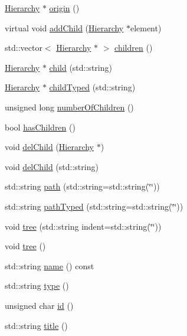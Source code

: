 \begin{DoxyCompactItemize}
\hyperlink{classHierarchy}{Hierarchy} $\ast$ \hyperlink{classHierarchy_aee461dc930ce3871636ff87f075b1b83}{origin} ()
\item 
virtual void \hyperlink{classHierarchy_ad677774ff38fcb257c04a3a10d471fac}{add\+Child} (\hyperlink{classHierarchy}{Hierarchy} $\ast$element)
\item 
std\+::vector$<$ \hyperlink{classHierarchy}{Hierarchy} $\ast$ $>$ \hyperlink{classHierarchy_aa9a76f69e98e052ee1a6e32cea006288}{children} ()
\item 
\hyperlink{classHierarchy}{Hierarchy} $\ast$ \hyperlink{classHierarchy_a1e207f973c694b538bf90107b4868817}{child} (std\+::string)
\item 
\hyperlink{classHierarchy}{Hierarchy} $\ast$ \hyperlink{classHierarchy_a0c15a5276a3b80b4354d6bd8a01e0708}{child\+Typed} (std\+::string)
\item 
unsigned long \hyperlink{classHierarchy_ab16e84de65fd84e14001a6cf941c8be4}{number\+Of\+Children} ()
\item 
bool \hyperlink{classHierarchy_a255174fe4d316d2a3f430dcb9dab29f1}{has\+Children} ()
\item 
void \hyperlink{classHierarchy_a2b2b359fac003233f65786a616766bde}{del\+Child} (\hyperlink{classHierarchy}{Hierarchy} $\ast$)
\item 
void \hyperlink{classHierarchy_a1928ac7615fe0b5e55cd707f70dc6781}{del\+Child} (std\+::string)
\item 
std\+::string \hyperlink{classHierarchy_aa7990fa7caf132d83e361ce033c6c65a}{path} (std\+::string=std\+::string(\char`\"{}\char`\"{}))
\item 
std\+::string \hyperlink{classHierarchy_a1efd56cd164d328d2002e53a10a19b8c}{path\+Typed} (std\+::string=std\+::string(\char`\"{}\char`\"{}))
\item 
void \hyperlink{classHierarchy_a76e914b9a677a22a82deb74d892bf261}{tree} (std\+::string indent=std\+::string(\char`\"{}\char`\"{}))
\item 
void \hyperlink{classHierarchy_a594c294c5f60c230e106d522ed008212}{tree} ()
\item 
std\+::string \hyperlink{classObject_a300f4c05dd468c7bb8b3c968868443c1}{name} () const
\item 
std\+::string \hyperlink{classObject_a84f99f70f144a83e1582d1d0f84e4e62}{type} ()
\item 
unsigned char \hyperlink{classObject_af99145335cc61ff6e2798ea17db009d2}{id} ()
\item 
std\+::string \hyperlink{classObject_a73a0f1a41828fdd8303dd662446fb6c3}{title} ()

\end{DoxyCompactItemize}
